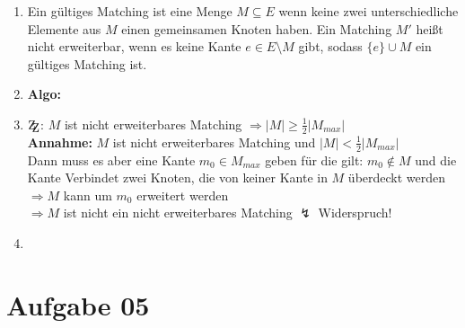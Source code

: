 \documentclass[10pt,a4paper]{article}
\newcommand{\zz}{\mathrm{Z\kern-.3em\raise-0.5ex\hbox{Z}}}
\begin{document}
    \begin{enumerate}[label={\alph*)}]
        \item Ein gültiges Matching ist eine Menge $M \subseteq E$ wenn keine
            zwei unterschiedliche Elemente aus $M$ einen gemeinsamen Knoten
            haben.
            Ein Matching $M'$ heißt nicht erweiterbar, wenn es keine Kante
            $ e \in E \setminus M$ gibt, sodass $\{e\} \cup M$ ein gültiges
            Matching ist.
        \item
            \textbf{Algo:}\\
            \begin{algorithm}[H]
                
                
            \end{algorithm}

        \item
            $\zz$: $M$ ist nicht erweiterbares Matching $\Rightarrow
            |M| \geq \frac{1}{2}|M_{max}|$
            \\
            \textbf{Annahme:} $M$ ist nicht erweiterbares Matching und
            $|M| < \frac{1}{2}|M_{max}|$
            \\
            Dann muss es aber eine Kante $m_0 \in M_{max}$ geben für
            die gilt: $m_0 \notin M$ und die Kante Verbindet zwei Knoten,
            die von keiner Kante in $M$ überdeckt werden
            \\
            $\Rightarrow M$ kann um $m_0$ erweitert werden
            \\
            $\Rightarrow M$ ist nicht ein nicht erweiterbares Matching
            $\lightning$ Widerspruch!
        \item

    \end{enumerate}

\section*{Aufgabe 05}
\end{document}
